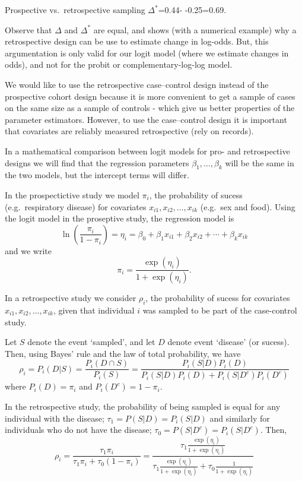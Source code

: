 \documentclass[
  ignorenonframetext,
]{beamer}
\begin{document}
\begin{frame}[fragile]{Prospective vs.~retrospective sampling}
\(\Delta^*\)=0.44- -0.25=0.69.

Observe that \(\Delta\) and \(\Delta^*\) are equal, and shows (with a
numerical example) why a retrospective design can be use to estimate
change in log-odds. But, this argumentation is only valid for our logit
model (where we estimate changes in odds), and not for the probit or
complementary-log-log model.

We would like to use the retrospective case--control design instead of
the prospective cohort design because it is more convenient to get a
sample of cases on the same size as a sample of controls - which give us
better properties of the parameter estimators. However, to use the
case--control design it is important that covariates are reliably
measured retrospective (rely on records).

In a mathematical comparison between logit models for pro- and
retrospective designs we will find that the regression parameters
\(\beta_1, \ldots, \beta_k\) will be the same in the two models, but the
intercept terms will differ.

In the prospectictive study we model \(\pi_i\), the probability of
sucess (e.g.~respiratory disease) for covariates
\(x_{i1}, x_{i2}, \ldots, x_{ik}\) (e.g.~sex and food). Using the logit
model in the proseptive study, the regression model is
\[ \ln (\frac{\pi_i}{1-\pi_i}) = \eta_i =  \beta_0+\beta_1 x_{i1}+\beta_2 x_{i2}+\cdots + \beta_k x_{ik} \]
and we write \[ \pi_i=\frac{\exp(\eta_i)}{1+\exp(\eta_i)}.\]

In a retrospective study we consider \(\rho_i\), the probability of
sucess for covariates \(x_{i1}, x_{i2}, \ldots, x_{ik}\), given that
individual \(i\) was sampled to be part of the case-control study.

Let \(S\) denote the event `sampled', and let \(D\) denote event
`disease' (or sucess). Then, using Bayes' rule and the law of total
probability, we have
\[ \rho_i= P_i(D|S) = \frac{P_i(D \cap S)}{P_i(S)} = \frac{P_i(S|D)P_i(D)}{P_i(S|D)P_i(D) + P_i(S|D^c)P_i(D^c)}  \]
where \(P_i(D) = \pi_i\) and \(P_i(D^c) = 1-\pi_i\).

In the retrospective study, the probability of being sampled is equal
for any individual with the disease; \(\tau_1 = P(S|D) = P_i(S|D)\) and
similarly for individuals who do not have the disease;
\(\tau_0 = P(S|D^c) = P_i(S|D^c)\). Then,
\[ \rho_i= \frac{\tau_1 \pi_i}{\tau_1 \pi_i + \tau_0 (1-\pi_i)}  =  \frac{\tau_1 \frac{\exp(\eta_i)}{1+\exp(\eta_i)}}{\tau_1 \frac{\exp(\eta_i)}{1+\exp(\eta_i)} + \tau_0 \frac{1}{1+\exp(\eta_i)}}\]


\end{frame}
\end{document}
